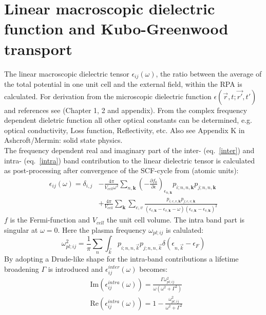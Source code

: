 \section{Linear macroscopic dielectric function and Kubo-Greenwood transport}

The linear macroscopic dielectric tensor $\epsilon_{ij}(\omega)$, the ratio between the average of the total potential in one unit cell and the external field, 
within the RPA is calculated. For derivation from the microscopic dielectric function $\epsilon(\vec{r},t;\vec{r'},t')$ and references see \cite{Draxl06} 
(Chapter 1, 2 and appendix). From the complex frequency dependent dieletric function all other optical constants can be determined, e.g. optical conductivity, 
Loss function, Reflectivity, etc. Also see Appendix K in Ashcroft/Mermin: solid state physics.\\
The frequency dependent real and imaginary part of the inter- (eq.~\ref{inter}) and intra- (eq.~\ref{intra}) band contribution to the linear dielectric tensor is calculated as post-processing after 
convergence of the SCF-cycle from (atomic units):
\begin{align}
 \epsilon_{ij}(\omega)=\delta_{i,j}&-\frac{4\pi}{ V_{cell}\omega^2}\sum_{n,\mathbf{k}}\left(-\frac{\partial f_0}{\partial \epsilon}\right)_{\epsilon_{n,\mathbf{k}}}p_{i;n,n,\mathbf{k}}p_{j;n,n,\mathbf{k}}\label{intra}\\
                       &+\frac{4\pi}{V_{cell}}\sum_{\mathbf{k}}\sum_{c,v}\frac{p_{i;c,v,\mathbf{k}}p_{j;c,v,\mathbf{k}}}{\left(\epsilon_{c,\mathbf{k}}-\epsilon_{v,\mathbf{k}}-\omega\right)\left(\epsilon_{c,\mathbf{k}}-\epsilon_{v,\mathbf{k}}\right)^2}\label{inter}
 \end{align}
$f$ is the Fermi-function and $V_{cell}$ the unit cell volume. The intra band part is singular at $\omega=0$. Here the plasma frequency $\omega_{pl;ij}$ is calulated:
\begin{equation}
 \omega^2_{pl;ij}=\frac{1}{\pi }\sum_n\int_{\vec{k}}p_{i;n,n,\vec{k}}p_{j;n,n,\vec{k}}\delta(\epsilon_{n,\vec{k}}-\epsilon_{F})
\end{equation}
By adopting a Drude-like shape for the intra-band contributions a lifetime broadening $\Gamma$ is introduced and $\epsilon_{ij}^{inter}(\omega)$ becomes:
\begin{align}
 &\mathrm{Im}(\epsilon_{ij}^{intra}(\omega))=\frac{\Gamma\omega^2_{pl;ij}}{\omega(\omega^2+\Gamma^2)}\\
&\mathrm{Re}(\epsilon_{ij}^{intra}(\omega))=1-\frac{\omega^2_{pl;ij}}{\omega^2+\Gamma^2}
\end{align}
